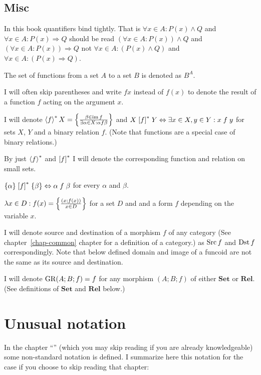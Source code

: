 \subsection{Misc}

In this book quantifiers bind tightly. That is $\forall x\in A:P(x)\land Q$
and $\forall x\in A:P(x)\Rightarrow Q$ should be read $\left(\forall x\in A:P(x)\right)\land Q$
and $\left(\forall x\in A:P(x)\right)\Rightarrow Q$ not $\forall x\in A:\left(P(x)\land Q\right)$
and $\forall x\in A:\left(P(x)\Rightarrow Q\right)$.

The set of functions from a set $A$ to a set $B$ is denoted as $B^{A}$.

I will often skip parentheses and write $fx$ instead of $f(x)$ to
denote the result of a function $f$ acting on the argument $x$.

I will denote $\left\langle f\right\rangle ^{\ast}X=\left\{ \frac{\beta\in\operatorname{im} f}{\exists\alpha\in X:\alpha\mathrel f\beta}\right\}$
and $X\mathrel{\left[f\right]^{\ast}}Y\Leftrightarrow\exists x\in X,y\in Y:x\mathrel{f}y$
for sets $X$, $Y$ and a binary relation $f$. (Note that functions
are a special case of binary relations.)

By just $\left\langle f\right\rangle ^{\ast}$ and $\mathrel{\left[f\right]^{\ast}}$ I will denote the corresponding
function and relation on small sets.
\begin{obvious}
$\{\alpha\}\mathrel{\left[f\right]^{\ast}}\{\beta\}\Leftrightarrow\alpha\mathrel f\beta$
for every $\alpha$ and $\beta$.
\end{obvious}
$\lambda x\in D:f(x)=\left\{ \frac{(x;f(x))}{x\in D}\right\}$ for a set $D$ and
and a form $f$ depending on the variable $x$.

I will denote source and destination of a morphism $f$ of any category
(See chapter~\ref{chap-common} chapter for a definition of a category.)
as $\operatorname{Src} f$ and $\operatorname{Dst} f$ correspondingly. Note that below defined
domain and image of a funcoid are not the same as its source and destination.

I will denote $\operatorname{GR}(A;B;f)=f$ for any morphism $(A;B;f)$ of either
$\mathbf{Set}$ or $\mathbf{Rel}$. (See definitions of $\mathbf{Set}$
and $\mathbf{Rel}$ below.)


\section{Unusual notation}

In the chapter ``'' (which you may skip reading
if you are already knowledgeable) some non-standard notation is defined.
I summarize here this notation for the case if you choose to skip
reading that chapter:

